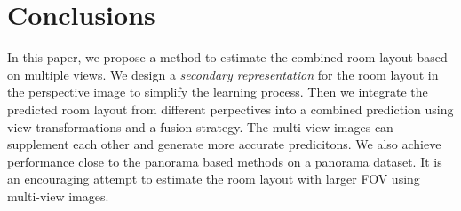 \section{Conclusions}
In this paper, we propose a method to estimate the combined room layout based on multiple views. We design a \emph{secondary representation} for the room layout in the perspective image to simplify the learning process. Then we integrate the predicted room layout from different perpectives into a combined prediction using view transformations and a fusion strategy. The multi-view images can supplement each other and generate more accurate predicitons. We also achieve performance close to the panorama based methods on a panorama dataset. It is an encouraging attempt to estimate the room layout with larger FOV using multi-view images.

